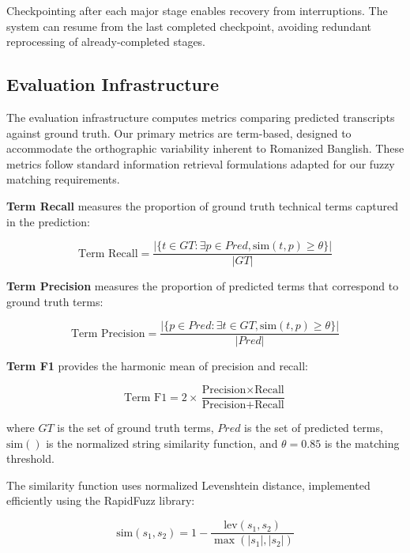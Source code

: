 Checkpointing after each major stage enables recovery from interruptions. The system can resume from the last completed checkpoint, avoiding redundant reprocessing of already-completed stages.

\subsection{Evaluation Infrastructure}

The evaluation infrastructure computes metrics comparing predicted transcripts against ground truth. Our primary metrics are term-based, designed to accommodate the orthographic variability inherent to Romanized Banglish. These metrics follow standard information retrieval formulations \cite{Jurafsky2000} adapted for our fuzzy matching requirements.

\textbf{Term Recall} measures the proportion of ground truth technical terms captured in the prediction:

\begin{equation}
\text{Term Recall} = \frac{|\{t \in GT : \exists p \in Pred, \text{sim}(t,p) \geq \theta\}|}{|GT|}
\end{equation}

\textbf{Term Precision} measures the proportion of predicted terms that correspond to ground truth terms:

\begin{equation}
\text{Term Precision} = \frac{|\{p \in Pred : \exists t \in GT, \text{sim}(t,p) \geq \theta\}|}{|Pred|}
\end{equation}

\textbf{Term F1} provides the harmonic mean of precision and recall:

\begin{equation}
\text{Term F1} = 2 \times \frac{\text{Precision} \times \text{Recall}}{\text{Precision} + \text{Recall}}
\end{equation}

where $GT$ is the set of ground truth terms, $Pred$ is the set of predicted terms, $\text{sim}()$ is the normalized string similarity function, and $\theta = 0.85$ is the matching threshold.

The similarity function uses normalized Levenshtein distance, implemented efficiently using the RapidFuzz library:

\begin{equation}
\text{sim}(s_1, s_2) = 1 - \frac{\text{lev}(s_1, s_2)}{\max(|s_1|, |s_2|)}
\end{equation}

